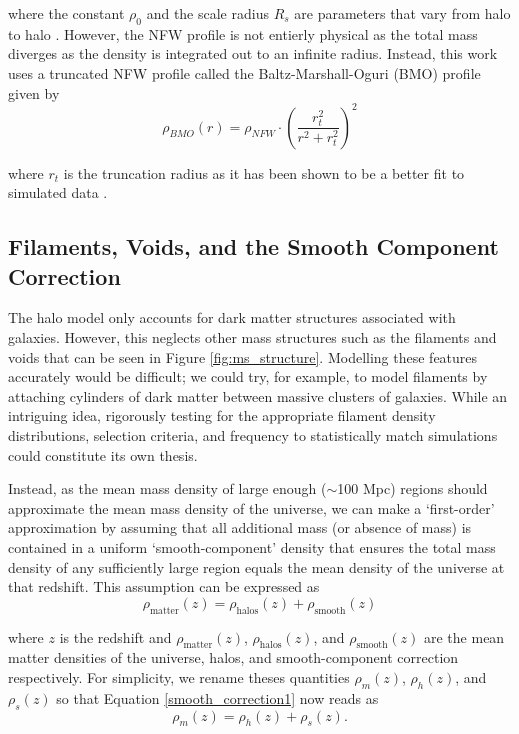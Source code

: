 \documentclass[%
 reprint,
 amsmath,amssymb,
 aps,nofootinbib
]{revtex4-1}
\begin{document}
\noindent where the constant $\rho_0$ and the scale radius $R_s$ are parameters that vary from halo to halo \cite{nfw}. However, the NFW profile is not entierly physical as the total mass diverges as the density is integrated out to an infinite radius. Instead, this work uses a truncated NFW profile called the Baltz-Marshall-Oguri (BMO) profile given by
\begin{equation}\label{bmo_profile}
\rho_{BMO}(r)=\rho_{NFW}\cdot\left(\frac{r_t^2}{r^2+r_t^2}\right)^2
\end{equation}

\noindent where $r_t$ is the truncation radius as it has been shown to be a better fit to simulated data \cite{nfw_bmo}.


\subsection{Filaments, Voids, and the Smooth Component Correction}\label{scc}

The halo model only accounts for dark matter structures associated with galaxies. However, this neglects other mass structures such as the filaments and voids that can be seen in Figure \ref{fig:ms_structure}. Modelling these features accurately would be difficult; we could try, for example, to model filaments by attaching cylinders of dark matter between massive clusters of galaxies. While an intriguing idea, rigorously testing for the appropriate filament density distributions, selection criteria, and frequency to statistically match simulations could constitute its own thesis.

Instead, as the mean mass density of large enough ($\sim$100 Mpc) regions should approximate the mean mass density of the universe, we can make a `first-order' approximation by assuming that all additional mass (or absence of mass) is contained in a uniform `smooth-component' density that ensures the total mass density of any sufficiently large region equals the mean density of the universe at that redshift. This assumption can be expressed as
\begin{equation}\label{smooth_correction1}
\rho_{\text{matter}}(z)=\rho_{\text{halos}}(z)+\rho_{\text{smooth}}(z)
\end{equation}

\noindent where $z$ is the redshift and $\rho_{\text{matter}}(z)$, $\rho_{\text{halos}}(z)$, and $\rho_{\text{smooth}}(z)$ are the mean matter densities of the universe, halos, and smooth-component correction respectively. For simplicity, we rename theses quantities ${\rho_m(z)}$, ${\rho_h(z)}$, and ${\rho_s(z)}$ so that Equation \eqref{smooth_correction1} now reads as
\begin{equation}\label{smooth_correction2}
\rho_m(z)=\rho_h(z)+\rho_s(z).
\end{equation}
\end{document}
